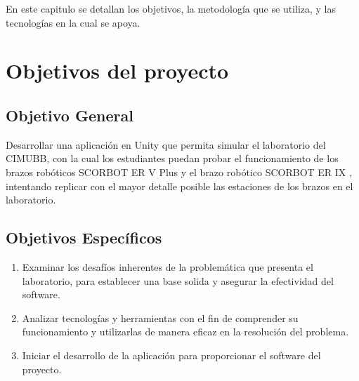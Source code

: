 En este capitulo se detallan los objetivos, la metodología que se utiliza, y las tecnologías en la cual se apoya.

\section{Objetivos del proyecto}

\subsection{Objetivo General}
Desarrollar una aplicación en Unity que permita simular el laboratorio
del CIMUBB, con la cual los estudiantes puedan probar el funcionamiento de los
brazos robóticos SCORBOT ER V Plus y el brazo robótico SCORBOT ER IX , intentando replicar con el mayor detalle posible
las estaciones de los brazos en el laboratorio.

\subsection{Objetivos Específicos}
\begin{enumerate}[label=\roman*.-]
\item Examinar los desafíos inherentes de la problemática que presenta el laboratorio, para establecer una base solida y asegurar la efectividad del software.
\item Analizar tecnologías y herramientas con el fin de comprender su funcionamiento y utilizarlas de manera eficaz en la resolución del problema.
\item Iniciar el desarrollo de la aplicación para proporcionar el software del proyecto.
\end{enumerate}

